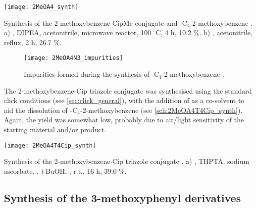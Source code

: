 \begin{scheme}[H]
	\begin{center}
		\texttt{[image: 2MeOA4\_synth]}
		\caption{Synthesis of the 2-methoxybenzene-CipMe conjugate  and -C$_4$-2-methoxybenzene . 
		a) , DIPEA, acetonitrile, microwave reactor, 100 $^{\circ}$C, 4 h, 10.2 \%.
		b) , acetonitrile, reflux, 2 h, 26.7 \%.  \label{sch:2MeOA4_synth}}
	\end{center}
\end{scheme}


\begin{figure}[H]
	\begin{center}
		\texttt{[image: 2MeOA4N3\_impurities]}
		\caption{Impurities formed during the synthesis of -C$_4$-2-methoxybenzene .
		\label{fig:2MeOA4N3_impurities}}
	\end{center}
\end{figure}

The 2-methoxybenzene-Cip triazole conjugate  was synthesised using the standard click conditions  (see \ref{sec:click_general}), with the addition of  as a co-solvent to aid the dissolution of -C$_4$-2-methoxybenzene  (see \ref{sch:2MeOA4T4Cip_synth}). Again, the yield was somewhat low, probably due to air/light sensitivity of the starting material and/or product.

\begin{scheme}[H]
	\begin{center}
				\texttt{[image: 2MeOA4T4Cip\_synth]}
		\caption{Synthesis of the 2-methoxybenzene-Cip triazole conjugate . 
		a) , THPTA, sodium ascorbate, , \textit{t}-BuOH, , r.t., 16 h, 39.0 \%.\label{sch:2MeOA4T4Cip_synth}}
	\end{center}
\end{scheme}

\subsection{Synthesis of the 3-methoxyphenyl derivatives}

